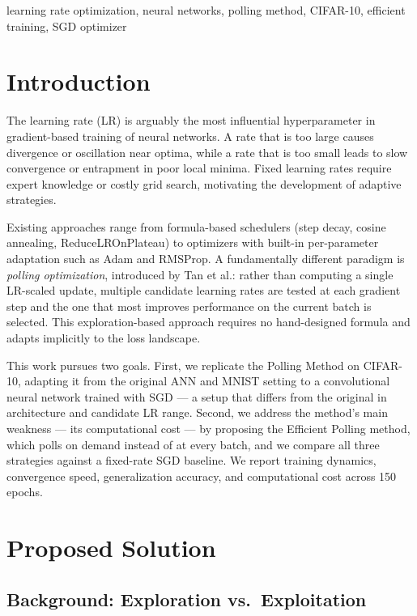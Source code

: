 \documentclass[conference]{IEEEtran}
\begin{document}
\begin{IEEEkeywords}
learning rate optimization, neural networks, polling method, CIFAR-10, efficient training, SGD optimizer
\end{IEEEkeywords}

\section{Introduction}

The learning rate (LR) is arguably the most influential hyperparameter in gradient-based training of neural networks. A rate that is too large causes divergence or oscillation near optima, while a rate that is too small leads to slow convergence or entrapment in poor local minima. Fixed learning rates require expert knowledge or costly grid search, motivating the development of adaptive strategies.

Existing approaches range from formula-based schedulers (step decay, cosine annealing, ReduceLROnPlateau) to optimizers with built-in per-parameter adaptation such as Adam and RMSProp. A fundamentally different paradigm is \emph{polling optimization}, introduced by Tan et al.: rather than computing a single LR-scaled update, multiple candidate learning rates are tested at each gradient step and the one that most improves performance on the current batch is selected. This exploration-based approach requires no hand-designed formula and adapts implicitly to the loss landscape.

This work pursues two goals. First, we replicate the Polling Method on CIFAR-10, adapting it from the original ANN and MNIST setting to a convolutional neural network trained with SGD --- a setup that differs from the original in architecture and candidate LR range. Second, we address the method's main weakness --- its computational cost --- by proposing the Efficient Polling method, which polls on demand instead of at every batch, and we compare all three strategies against a fixed-rate SGD baseline. We report training dynamics, convergence speed, generalization accuracy, and computational cost across 150 epochs.

\section{Proposed Solution}

\subsection{Background: Exploration vs.\ Exploitation}
\end{document}
